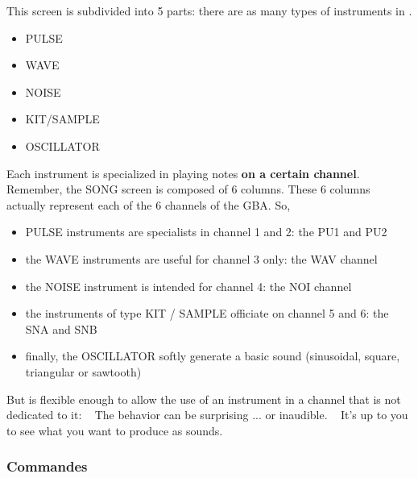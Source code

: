 This screen is subdivided into 5 parts: there are as many types of instruments in \FAT.
\medskip

\begin{itemize}
    \item{PULSE}
    \item{WAVE}
    \item{NOISE}
    \item{KIT/SAMPLE}
    \item{OSCILLATOR}
\end{itemize}\medskip

Each instrument is specialized in playing notes {\bf on a certain channel}.
Remember, the SONG screen is composed of 6 columns.
These 6 columns actually represent each of the 6 channels of the GBA. So,
 \medskip

 \begin{itemize}
    \item{PULSE instruments are specialists in channel 1 and 2: the PU1 and PU2}
    \item{the WAVE instruments are useful for channel 3 only: the WAV channel}
    \item{the NOISE instrument is intended for channel 4: the NOI channel}
    \item{the instruments of type KIT / SAMPLE officiate on channel 5 and 6: the SNA and SNB}
    \item{finally, the OSCILLATOR softly generate a basic sound (sinusoidal, square, triangular or sawtooth)}
 \end{itemize}\medskip

 But \FAT is flexible enough to allow the use of an instrument in a channel that is not dedicated to it:
   The behavior can be surprising ... or inaudible.
   It's up to you to see what you want to produce as sounds.

\subsubsection{Commandes}

